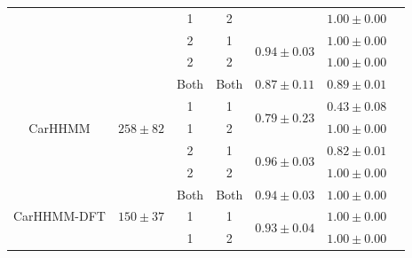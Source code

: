 \documentclass[12pt]{TD-CJS}
\begin{document}
{\begin{tabular}{ccccccc}
                            &                                    & 1                             & 2                                &                                   & $1.00 \pm 0.00$                       \\ 
                            &                                    & 2                             & 1                                & \multirow{2}{*}{$0.94\pm0.03$}    & $1.00 \pm 0.00$                       \\ 
                            &                                    & 2                             & 2                                &                                   & $1.00 \pm 0.00$                       \\ \hline
\multirow{5}{*}{CarHHMM}    & \multirow{5}{*}{$258 \pm 82$}   & Both                          & Both                             & $0.87 \pm 0.11$                   & $0.89 \pm 0.01$                       \\
                            &                                    & 1                             & 1                                & \multirow{2}{*}{$0.79\pm0.23$}    & $0.43 \pm 0.08$                       \\ 
                            &                                    & 1                             & 2                                &                                   & $1.00 \pm 0.00$                       \\ 
                            &                                    & 2                             & 1                                & \multirow{2}{*}{$0.96\pm0.03$}    & $0.82 \pm 0.01$                       \\ 
                            &                                    & 2                             & 2                                &                                   & $1.00 \pm 0.00$                       \\ \hline
\multirow{5}{*}{CarHHMM-DFT}& \multirow{5}{*}{$150 \pm 37$}   & Both                          & Both                             & $0.94 \pm 0.03$                   & $1.00 \pm 0.00$                       \\
                            &                                    & 1                             & 1                                & \multirow{2}{*}{$0.93\pm0.04$}    & $1.00 \pm 0.00$                       \\ 
                            &                                    & 1                             & 2                                &                                   & $1.00 \pm 0.00$                       \\ 

\end{tabular}}
\end{document}
